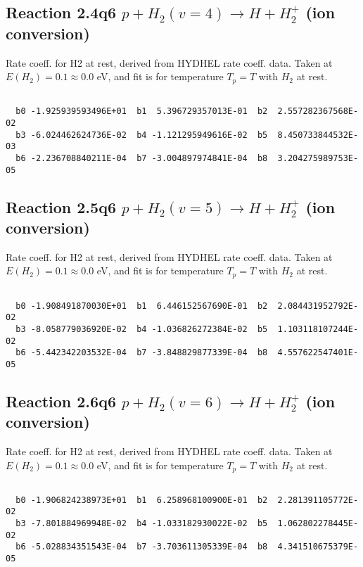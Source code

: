 \newpage
\subsection{
Reaction 2.4q6
$ p + H_2(v=4) \rightarrow H + H_2^+$ (ion conversion)
}
Rate coeff. for H2 at rest, derived from HYDHEL rate coeff. data.
Taken at $E(H_2) = 0.1 \approx 0.0$ eV,  and fit is for temperature $T_p=T$ with $H_2$ at rest.

\begin{small}\begin{verbatim}

  b0 -1.925939593496E+01  b1  5.396729357013E-01  b2  2.557282367568E-02
  b3 -6.024462624736E-02  b4 -1.121295949616E-02  b5  8.450733844532E-03
  b6 -2.236708840211E-04  b7 -3.004897974841E-04  b8  3.204275989753E-05

\end{verbatim}\end{small}

\newpage
\subsection{
Reaction 2.5q6
$ p + H_2(v=5) \rightarrow H + H_2^+$ (ion conversion)
}
Rate coeff. for H2 at rest, derived from HYDHEL rate coeff. data.
Taken at $E(H_2) = 0.1 \approx 0.0$ eV,  and fit is for temperature $T_p=T$ with $H_2$ at rest.

\begin{small}\begin{verbatim}

  b0 -1.908491870030E+01  b1  6.446152567690E-01  b2  2.084431952792E-02
  b3 -8.058779036920E-02  b4 -1.036826272384E-02  b5  1.103118107244E-02
  b6 -5.442342203532E-04  b7 -3.848829877339E-04  b8  4.557622547401E-05

\end{verbatim}\end{small}

\newpage
\subsection{
Reaction 2.6q6
$ p + H_2(v=6) \rightarrow H + H_2^+$ (ion conversion)
}
Rate coeff. for H2 at rest, derived from HYDHEL rate coeff. data.
Taken at $E(H_2) = 0.1 \approx 0.0$ eV,  and fit is for temperature $T_p=T$ with $H_2$ at rest.

\begin{small}\begin{verbatim}

  b0 -1.906824238973E+01  b1  6.258968100900E-01  b2  2.281391105772E-02
  b3 -7.801884969948E-02  b4 -1.033182930022E-02  b5  1.062802278445E-02
  b6 -5.028834351543E-04  b7 -3.703611305339E-04  b8  4.341510675379E-05

\end{verbatim}\end{small}

